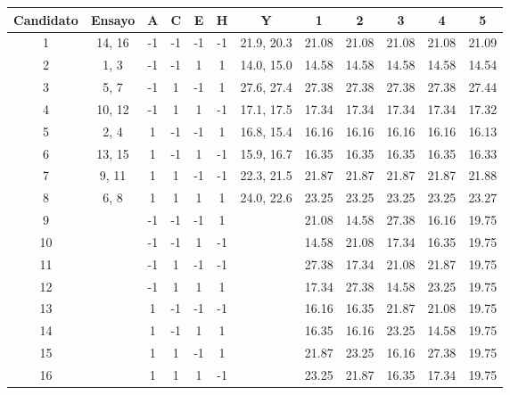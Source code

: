 \begin{center}
	\begin{tabular}{cc|ccccc|ccccc}
		Candidato & Ensayo & A & C & E & H & Y & 1 & 2 & 3 & 4 & 5 \\
		\hline
		1 & 14, 16 & -1 & -1 & -1 & -1 & 21.9, 20.3 & 21.08 & 21.08 & 21.08 & 21.08 & 21.09 \\
		
		2 & 1, 3 & -1 & -1 & 1 & 1 & 14.0, 15.0 & 14.58 & 14.58 & 14.58 & 14.58 & 14.54 \\
		
		3 & 5, 7 & -1 & 1 & -1 & 1 & 27.6, 27.4 & 27.38 & 27.38 & 27.38 & 27.38 & 27.44 \\
		
		4 & 10, 12 & -1 & 1 & 1 & -1 & 17.1, 17.5 & 17.34 & 17.34 & 17.34 & 17.34 & 17.32 \\
		
		5 & 2, 4 & 1 & -1 & -1 & 1 & 16.8, 15.4 & 16.16 & 16.16 & 16.16 & 16.16 & 16.13 \\
		
		6 & 13, 15 & 1 & -1 & 1 & -1 & 15.9, 16.7 & 16.35 & 16.35 & 16.35 & 16.35 & 16.33  \\
		
		7 & 9, 11 & 1 & 1 & -1 & -1 & 22.3, 21.5 & 21.87 & 21.87 & 21.87 & 21.87 & 21.88 \\
		
		8 & 6, 8 & 1 & 1 & 1 & 1 & 24.0, 22.6 & 23.25 & 23.25 & 23.25 & 23.25 & 23.27 \\
		
		9 &  & -1 & -1 & -1 & 1 &  & 21.08 & 14.58 & 27.38 & 16.16 & 19.75 \\
		
		10 &  & -1 & -1 & 1 & -1 &  & 14.58 & 21.08 & 17.34 & 16.35 & 19.75 \\
		
		11 &  & -1 & 1 & -1 & -1 &   & 27.38 & 17.34 & 21.08 & 21.87 & 19.75 \\
		
		12 &  & -1 & 1 & 1 & 1 &   & 17.34 & 27.38 & 14.58 & 23.25 & 19.75 \\
		
		13 &   & 1 & -1 & -1 & -1 &   & 16.16 & 16.35 & 21.87 & 21.08 & 19.75 \\
		
		14 &   & 1 & -1 & 1 & 1 &   & 16.35 & 16.16 & 23.25 & 14.58 & 19.75 \\
		
		15 &   & 1 & 1 & -1 & 1 &   & 21.87 & 23.25 & 16.16 & 27.38 & 19.75 \\
		
		16 &   & 1 & 1 & 1 & -1 &    & 23.25 & 21.87 & 16.35 & 17.34 & 19.75 \\
		
	\end{tabular}
	 \label{extra_runs_ej1}
\end{center}

